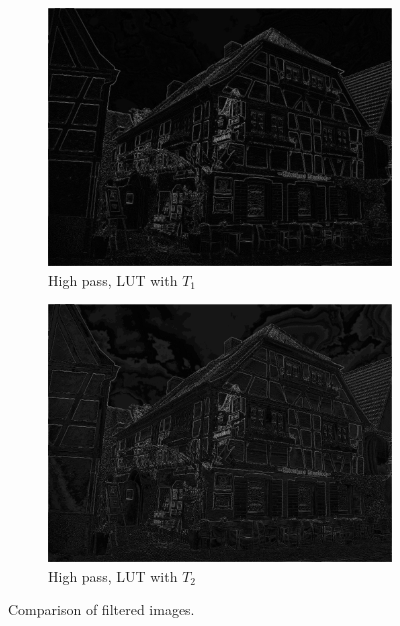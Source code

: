 \documentclass{beamer}
\begin{document}
\begin{frame}
\begin{figure}[h]
\begin{subfigure}[b]{0.35\textwidth} \includegraphics[width=\textwidth]{house_lut_212.png} \caption{High pass, LUT with $T_1$} %
\end{subfigure}
\begin{subfigure}[b]{0.35\textwidth} \includegraphics[width=\textwidth]{house_lut_424.png} \caption{High pass, LUT with $T_2$} \end{subfigure}
\caption{Comparison of filtered images.}
\label{fig:house} 
\end{figure}
\end{frame}
\end{document}
